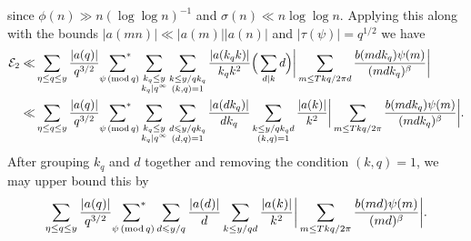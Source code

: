 \documentclass[oneside, 12pt]{amsart}
\theoremstyle{definition}
\renewcommand{\pmod}[1]{\,(\textup{mod}\,#1)}
\newcommand{\leqs}{\leqslant }
\begin{document}
since $\phi(n)\gg n (\log \log n)^{-1}$ and $\sigma(n)\ll n \log \log n$. Applying this along with the bounds $|a(mn)|\ll |a(m)||a(n)|$ and $|\tau(\psi)|=q^{1/2}$ we have 
\begin{align*}
\mathcal{E}_2
\ll & 
\sum_{\eta \leq q\leq y} \frac{|a(q)|}{q^{3/2}}
\sideset{}{^*}\sum_{\,\,\psi \pmod q} 
\sum_{\substack{k_q\leq y\\ k_q\mid q^\infty}}
\sum_{\substack{k\leq y/qk_q\\ (k, q)=1}}
 \frac{|a(k_qk)|}{k_qk^2}
\Big( \sum_{\substack{d\mid k}} d\Big)
\bigg|\sum_{m\leq Tkq/2\pi d}\frac{b(mdk_q)\psi(m)}{(mdk_q)^\beta}\bigg|
\\
\ll &
\sum_{\eta \leq q\leq y} \frac{|a(q)|}{q^{3/2}}
\sideset{}{^*}\sum_{\,\,\psi \pmod q} 
\sum_{\substack{k_q\leq y\\ k_q\mid q^\infty}}
\sum_{\substack{d\leqs y/qk_q\\ (d, q)=1}}\frac{|a(dk_q)|}{dk_q}
\sum_{\substack{k\leq y/qk_qd\\ (k, q)=1}}
 \frac{|a(k)|}{k^2}
\bigg|\sum_{m\leq Tkq/2\pi }\frac{b(mdk_q)\psi(m)}{(mdk_q)^\beta}\bigg|.
\end{align*}
After grouping $k_q$ and $d$ together and removing the condition $(k,q)=1$, we may upper bound this by 
\[
\sum_{\eta \leq q\leq y} \frac{|a(q)|}{q^{3/2}}
\sideset{}{^*}\sum_{\,\,\psi \pmod q} 
\sum_{d\leqs y/q}\frac{|a(d)|}{d}
\sum_{\substack{k\leq y/qd}}
 \frac{|a(k)|}{k^2}
\bigg|\sum_{m\leq Tkq/2\pi }\frac{b(md)\psi(m)}{(md)^\beta}\bigg|.
\]
\end{document}
